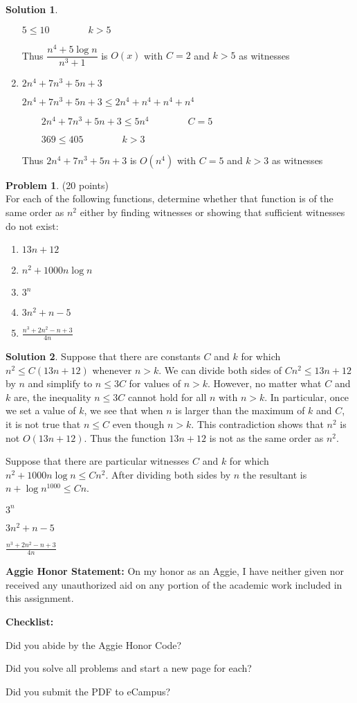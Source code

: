 \documentclass{article}
\theoremstyle{definition}
\newtheorem{problem}{Problem}
\newtheorem*{solution}{Solution}
\newcommand{\honor}{\noindent \textbf{Aggie Honor Statement: }On my honor as an Aggie, I have neither
  given nor received any unauthorized aid on any portion of the academic work included in this assignment.
}
\newcommand{\checklist}{\noindent\textbf{Checklist:}
\begin{compactenum}
\item Did you abide by the Aggie Honor Code?
\item Did you solve all problems and start a new page for each? 
\item Did you submit the PDF to eCampus?
\end{compactenum}
}
\begin{document}
\begin{solution}
\begin{enumerate}
\qquad $5\leq 10\qquad \qquad k>5$

\qquad Thus $\dfrac{n^{4}+5\log {n}}{n^{3}+1}$ is $O(x)$ with $C=2$ and $k>5$
as witnesses

\item $2n^{4}+7n^{3}+5n+3$

\qquad $2n^{4}+7n^{3}+5n+3\leq 2n^{4}+n^{4}+n^{4}+n^{4}$

$\qquad 2n^{4}+7n^{3}+5n+3\leq 5n^{4}\qquad \qquad C=5$

$\qquad 369\leq 405\qquad \qquad k>3$\newline

\qquad Thus $2n^{4}+7n^{3}+5n+3$ is $O(n^{4})$ with $C=5$ and $k>3$ as
witnesses
\end{enumerate}


\end{solution}

\newpage

\begin{problem} (20 points)\\
For each of the following functions, determine whether that function is of the same order as $n^2$ either by finding witnesses or showing that sufficient witnesses do not exist:
\begin{enumerate}
\item $13n+12$
\item $n^2+1000 n\log{n}$
\item $3^n$
\item $3n^2+n-5$
\item $\displaystyle \frac{n^3+2n^2-n+3}{4n}$
\end{enumerate}
\end{problem}

\begin{solution}

\item Suppose that there are constants $C$ and $k$ for which $n^2 \leq C(13n+12)$ whenever $n > k$. We can divide both 
		sides of $Cn^2 \leq 13n+12$ by $n$ and simplify to $n \leq 3C$ for values of $n > k$. However, no matter what 
        $C$ and $k$ are, the inequality $n \leq 3C$ cannot hold for all $n$ with $n > k$. In particular, once we set a 
        value of $k$, we see that when $n$ is larger than the maximum of $k$ and $C$, it is not true that $n \leq C$ 
        even though $n > k$. This contradiction shows that $n^2$ is not $O(13n+12)$. Thus the function $13n+12$ is not 
        as the same order as $n^2$.
\item Suppose that there are particular witnesses $C$ and $k$ for which $n^2+1000n\log{n} \leq Cn^2$. After dividing both sides by $n$ the resultant is $ n + \log{{n}^{1000}}\leq Cn$.
\item $3^n$
\item $3n^2+n-5$
\item $\displaystyle \frac{n^3+2n^2-n+3}{4n}$

\end{solution}


\newpage


\bigskip
\honor

\bigskip
\checklist
\end{document}

